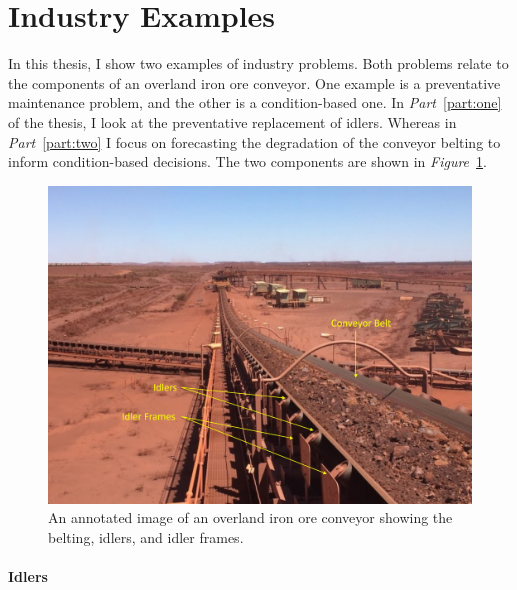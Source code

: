 \section{Industry Examples}
\label{sec:industry-data}

In this thesis, I show two examples of industry problems. Both problems relate to the components of an overland iron ore conveyor. One example is a preventative maintenance problem, and the other is a condition-based one. In \textit{Part}~\ref{part:one} of the thesis, I look at the preventative replacement of idlers. Whereas in \textit{Part}~\ref{part:two} I focus on forecasting the degradation of the conveyor belting to inform condition-based decisions. The two components are shown in \textit{Figure}~\ref{fig:belt_and_frame}.

\begin{figure}[h]
  \centering
  \includegraphics[width=1\textwidth]{./figures/cvr_example_edit_annotation.jpg}
  \caption{An annotated image of an overland iron ore conveyor \citep{australianmining2020} showing the belting, idlers, and idler frames.}
  \label{fig:belt_and_frame}
\end{figure}

\paragraph*{Idlers}

